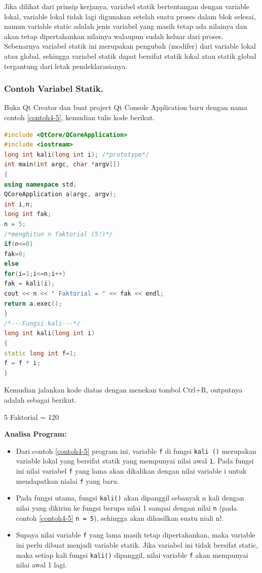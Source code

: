 Jika dilihat dari prinsip kerjanya, variabel statik bertentangan dengan
variable lokal, variable lokal tidak lagi digunakan setelah suatu proses
dalam blok selesai, namun variable static adalah jenis variabel yang
masih tetap ada nilainya dan akan tetap dipertahankan nilainya walaupun
sudah keluar dari proses. Sebenarnya variabel statik ini merupakan
pengubah (modifer) dari variable lokal atau global, sehingga variabel
statik dapat bersifat statik lokal atau statik global tergantung dari
letak pendeklarasianya.

\subsubsection*{Contoh  Variabel Statik.}

Buka Qt Creator dan buat project Qt Console Application baru dengan nama
contoh \ref{contoh4-5}, kemudian tulis kode berikut.

\begin{lstlisting}[language=c++, caption=Variabel Statik, label=contoh4-5]
#include <QtCore/QCoreApplication>
#include <iostream>
long int kali(long int i); /*prototype*/
int main(int argc, char *argv[])
{
using namespace std;
QCoreApplication a(argc, argv);
int i,n;
long int fak;
n = 5;
/*menghitun n faktorial (5!)*/
if(n<=0)
fak=0;
else
for(i=1;i<=n;i++)
fak = kali(i);
cout << n << " Faktorial = " << fak << endl;
return a.exec();
}
/*---Fungsi kali---*/
long int kali(long int i)
{
static long int f=1;
f = f * i;
}
\end{lstlisting}

Kemudian jalankan kode diatas dengan menekan tombol Ctrl+R, outputnya
adalah sebagai berikut.

\begin{lcverbatim}
5 Faktorial = 120
\end{lcverbatim} 

\textbf{Analisa Program:}

\begin{itemize}

\item
  Dari contoh \ref{contoh4-5} program ini, variable \texttt{f} di fungsi
  \texttt{kali\ ()} merupakan variable lokal yang bersifat statik yang
  mempunyai nilai awal \texttt{1}. Pada fungsi ini nilai variabel
  \texttt{f} yang lama akan dikalikan dengan nilai variable i untuk
  mendapatkan nialai \texttt{f} yang baru.\\
\item
  Pada fungsi utama, fungsi \texttt{kali()} akan dipanggil sebanyak n
  kali dengan nilai yang dikirim ke fungsi berupa nilai 1 sampai dengan
  nilai \texttt{n} (pada contoh \ref{contoh4-5} \texttt{n\ =\ 5}), sehingga akan
  dihasilkan suatu niali n!.\\
\item
  Supaya nilai variable \texttt{f} yang lama masih tetap dipertahankan,
  maka variable ini perlu dibuat menjadi variable statik. Jika variabel
  ini tidak bersifat static, maka setiap kali fungsi \texttt{kali()}
  dipanggil, nilai variable \texttt{f} akan mempunyai nilai awal 1 lagi.
\end{itemize}

